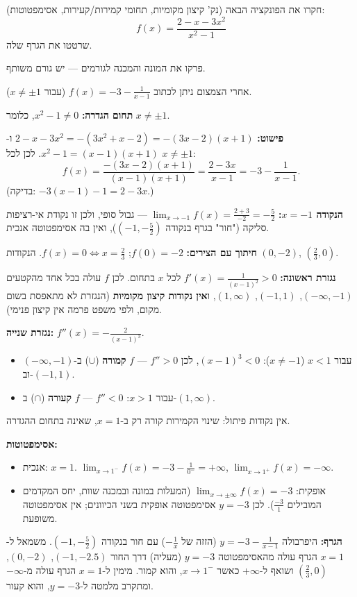 
\begin{question}
חקרו את הפונקציה הבאה (נק' קיצון מקומיות, תחומי קמירות/קעירות, אסימפטוטות):
\[ f(x)=\frac{2-x-3x^2}{x^2-1} \]
שרטטו את הגרף שלה.
\end{question}

\begin{hint}
פרקו את המונה והמכנה לגורמים — יש גורם משותף.
\end{hint}

\begin{hint}
אחרי הצמצום ניתן לכתוב $f(x)=-3-\frac{1}{x-1}$ (עבור $x\neq\pm1$).
\end{hint}

\begin{solution}
\textbf{תחום הגדרה:} $x^2-1\neq0$, כלומר $x\neq\pm1$.

\textbf{פישוט:} $2-x-3x^2=-(3x^2+x-2)=-(3x-2)(x+1)$ ו-$x^2-1=(x-1)(x+1)$. לכן לכל $x\neq\pm1$:
\[ f(x)=\frac{-(3x-2)(x+1)}{(x-1)(x+1)}=\frac{2-3x}{x-1}=-3-\frac{1}{x-1}. \]
(בדיקה: $-3(x-1)-1=2-3x$.)

\textbf{הנקודה $x=-1$:} $\lim_{x\to-1}f(x)=\frac{2+3}{-2}=-\frac52$ — גבול סופי, ולכן זו נקודת אי-רציפות סליקה ("חור" בגרף בנקודה $(-1,-\frac52)$), ואין בה אסימפטוטה אנכית.

\textbf{חיתוך עם הצירים:} $f(0)=-2$; $f(x)=0\iff x=\frac23$. הנקודות $(0,-2)$, $(\frac23,0)$.

\textbf{נגזרת ראשונה:} $f'(x)=\frac{1}{(x-1)^2}>0$ לכל $x$ בתחום. לכן $f$ עולה בכל אחד מהקטעים $(-\infty,-1)$, $(-1,1)$, $(1,\infty)$, ו\textbf{אין נקודות קיצון מקומיות} (הנגזרת לא מתאפסת בשום מקום, ולפי משפט פרמה אין קיצון פנימי).

\textbf{נגזרת שנייה:} $f''(x)=-\frac{2}{(x-1)^3}$.
\begin{itemize}
  \item עבור $x<1$ ($x\neq-1$): $(x-1)^3<0$, לכן $f''>0$ — $f$ \textbf{קמורה} ($\cup$) ב-$(-\infty,-1)$ וב-$(-1,1)$.
  \item עבור $x>1$: $f''<0$ — $f$ \textbf{קעורה} ($\cap$) ב-$(1,\infty)$.
\end{itemize}
אין נקודות פיתול: שינוי הקמירות קורה רק ב-$x=1$, שאינה בתחום ההגדרה.

\textbf{אסימפטוטות:}
\begin{itemize}
  \item אנכית: $x=1$. $\lim_{x\to1^-}f(x)=-3-\frac{1}{0^-}=+\infty$, $\lim_{x\to1^+}f(x)=-\infty$.
  \item אופקית: $\lim_{x\to\pm\infty}f(x)=-3$ (המעלות במונה ובמכנה שוות, יחס המקדמים המובילים $\frac{-3}{1}$). לכן $y=-3$ אסימפטוטה אופקית בשני הכיוונים; אין אסימפטוטה משופעת.
\end{itemize}

\textbf{הגרף:} היפרבולה $y=-3-\frac1{x-1}$ (הזזה של $-\frac1x$) עם חור בנקודה $(-1,-\frac52)$. משמאל ל-$x=1$ הגרף עולה מהאסימפטוטה $y=-3$ (מעליה) דרך החור $(-1,-2.5)$, $(0,-2)$, $(\frac23,0)$ ושואף ל-$+\infty$ כאשר $x\to1^-$, והוא קמור. מימין ל-$x=1$ הגרף עולה מ-$-\infty$ ומתקרב מלמטה ל-$y=-3$, והוא קעור.
\end{solution}
